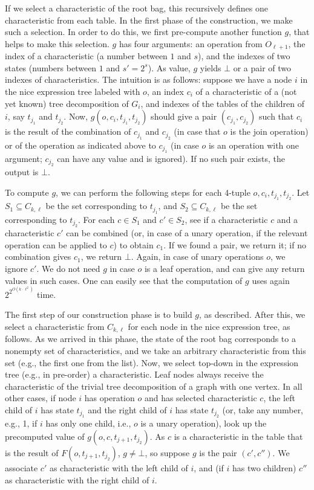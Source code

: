 \documentclass[a4paper,11pt]{article}
\theoremstyle{definition}
\theoremstyle{remark}
\newcommand{\false}{\bot}
\begin{document}
If we select a characteristic of the root bag, this recursively
defines one characteristic from each table.  In the first phase of the
construction, we make such a selection.  In order to do this, we first
pre-compute another function $g$, that helps to make this selection.
$g$ has four arguments: an operation from $O_{\ell+1}$, the index of a
characteristic (a number between $1$ and $s$), and the indexes of two
states (numbers between $1$ and $s'=2^s$).  As value, $g$ yields
$\false$ or a pair of two indexes of characteristics.  The intuition
is as follows: suppose we have a node $i$ in the nice expression tree
labeled with $o$, an index $c_i$ of a characteristic of a (not yet
known) tree decomposition of $G_i$, and indexes of the tables of the
children of $i$, say $t_{j_1}$ and $t_{j_2}$.  Now,
$g(o,c_i,t_{j_1},t_{j_2})$ should give a pair $(c_{j_1},c_{j_2})$ such
that $c_i$ is the result of the combination of $c_{j_1}$ and $c_{j_2}$
(in case that $o$ is the join operation) or of the operation as
indicated above to $c_{j_1}$ (in case $o$ is an operation with one
argument; $c_{j_2}$ can have any value and is ignored).  If no such
pair exists, the output is $\false$.

To compute $g$, we can perform the following steps for each 4-tuple
$o,c_i,t_{j_1},t_{j_2}$.  Let $S_1 \subseteq C_{k,\ell}$ be the set
corresponding to $t_{j_1}$, and $S_2 \subseteq C_{k,\ell}$ be the set
corresponding to $t_{j_2}$.  For each $c\in S_1$ and $c'\in S_2$, see
if a characteristic $c$ and a characteristic $c'$ can be combined (or,
in case of a unary operation, if the relevant operation can be applied
to $c$) to obtain $c_1$.  If we found a pair, we return it; if no
combination gives $c_1$, we return $\false$.  Again, in case of unary
operations $o$, we ignore $c'$.  We do not need $g$ in case $o$ is a
leaf operation, and can give any return values in such cases.  One can
easily see that the computation of $g$ uses again $2^{2^{O(k \cdot
    \ell^2)}}$ time.

The first step of our construction phase is to build $g$, as
described.  After this, we select a characteristic from $C_{k,\ell}$
for each node in the nice expression tree, as follows.  As we arrived
in this phase, the state of the root bag corresponds to a nonempty set
of characteristics, and we take an arbitrary characteristic from this
set (e.g., the first one from the list).  Now, we select top-down in
the expression tree (e.g., in pre-order) a characteristic.  Leaf nodes
always receive the characteristic of the trivial tree decomposition of
a graph with one vertex.  In all other cases, if node $i$ has
operation $o$ and has selected characteristic $c$, the left child of
$i$ has state $t_{j_1}$ and the right child of $i$ has state $t_{j_2}$
(or, take any number, e.g., 1, if $i$ has only one child, i.e., $o$ is
a unary operation), look up the precomputed value of
$g(o,c,t_{j+1},t_{j_2})$.  As $c$ is a characteristic in the table
that is the result of $F(o,t_{j+1},t_{j_2})$, $g \neq \false$, so
suppose $g$ is the pair $(c', c'')$.  We associate $c'$ as
characteristic with the left child of $i$, and (if $i$ has two
children) $c''$ as characteristic with the right child of $i$.
\end{document}
